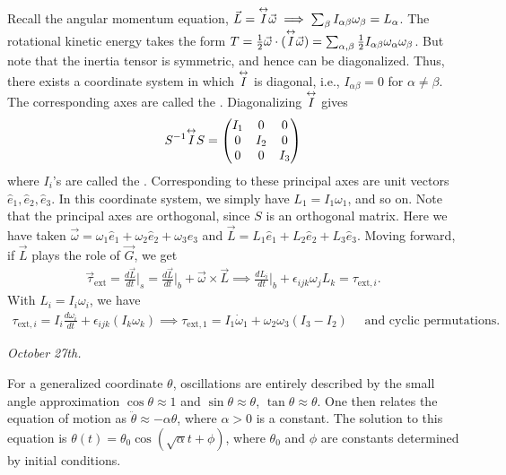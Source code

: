 Recall the angular momentum equation, $\vec{L} = \overset{\leftrightarrow}{I} \vec{\omega} \implies \sum_{\beta} I_{\alpha \beta} \omega_{\beta} = L_{\alpha}$. The rotational kinetic energy takes the form $T = \frac{1}{2} \vec{\omega} \cdot (\overset{\leftrightarrow}{I} \vec{\omega}) = \sum_{\alpha,\beta} \frac{1}{2} I_{\alpha \beta} \omega_{\alpha} \omega_{\beta}$. But note that the inertia tensor is symmetric, and hence can be diagonalized. Thus, there exists a coordinate system in which $\overset{\leftrightarrow}{I}$ is diagonal, i.e., $I_{\alpha \beta} = 0$ for $\alpha \neq \beta$. The corresponding axes are called the . Diagonalizing $\overset{\leftrightarrow}{I}$ gives
\begin{align}
    S^{-1} \overset{\leftrightarrow}{I} S = \begin{pmatrix}
        I_{1} & 0 & 0 \\
        0 & I_{2} & 0 \\
        0 & 0 & I_{3}
    \end{pmatrix}
\end{align}
where $I_{i}$'s are called the . Corresponding to these principal axes are unit vectors $\hat{e}_{1},\hat{e}_{2},\hat{e}_{3}$. In this coordinate system, we simply have $L_{1} = I_{1}\omega_{1}$, and so on. Note that the principal axes are orthogonal, since $S$ is an orthogonal matrix. Here we have taken $\vec{\omega} = \omega_{1} \hat{e}_{1} + \omega_{2} \hat{e}_{2} + \omega_{3} \hat{e}_{3}$ and $\vec{L} = L_{1} \hat{e}_{1} + L_{2} \hat{e}_{2} + L_{3} \hat{e}_{3}$. Moving forward, if $\vec{L}$ plays the role of $\vec{G}$, we get
\begin{align}
    \vec{\tau}_{\text{ext}} = \frac{d\vec{L}}{dt}\Big|_{s} = \frac{d\vec{L}}{dt}\Big|_{b} + \vec{\omega} \times \vec{L} \implies \frac{dL_{i}}{dt}\Big|_{b} + \epsilon_{ijk} \omega_{j} L_{k} = \tau_{\text{ext},i}.
\end{align}
With $L_{i} = I_{i} \omega_{i}$, we have
\begin{align}
    \tau_{\text{ext},i} = I_{i} \frac{d\omega_{i}}{dt} + \epsilon_{ijk} (I_{k} \omega_{k}) \implies \tau_{\text{ext},1} = I_{1}\dot{\omega}_{1} + \omega_{2}\omega_{3}(I_{3}-I_{2}) \quad \text{ and cyclic permutations.}
\end{align}

\noindent\textit{October 27th.}

For a generalized coordinate $\theta$, oscillations are entirely described by the small angle approximation $\cos \theta \approx 1$ and $\sin \theta \approx \theta$, $\tan \theta \approx \theta$. One then relates the equation of motion as $\ddot{\theta} \approx - \alpha \theta$, where $\alpha > 0$ is a constant. The solution to this equation is $\theta(t) = \theta_{0} \cos(\sqrt{\alpha} t + \phi)$, where $\theta_{0}$ and $\phi$ are constants determined by initial conditions.

